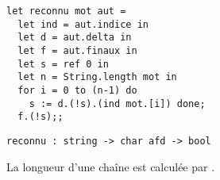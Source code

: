 \begin{Answer}
\begin{lstlisting}
let reconnu mot aut =
  let ind = aut.indice in
  let d = aut.delta in
  let f = aut.finaux in
  let s = ref 0 in
  let n = String.length mot in
  for i = 0 to (n-1) do
    s := d.(!s).(ind mot.[i]) done;
  f.(!s);;
\end{lstlisting}
\end{Answer} 
\begin{lstlisting}
reconnu : string -> char afd -> bool
\end{lstlisting}
La longueur d'une chaîne est calculée par .

